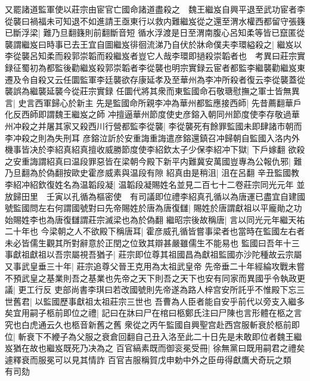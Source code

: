 又罷諸道監軍使以莊宗由宦官亡國命諸道盡殺之　魏王繼岌自興平退至武功宦者李從襲曰禍福未可知退不如進請王亟東行以救内難繼岌從之還至渭水權西都留守張籛已斷浮梁|{
	難乃旦翻籛則前翻斷音短}
循水浮渡是日至渭南腹心呂知柔等皆已竄匿從襲謂繼岌曰時事已去王宜自圖繼岌徘徊流涕乃自伏於牀命僕夫李環縊殺之|{
	繼岌以李從襲呂知柔而殺郭崇韜而殺繼岌者豈它人哉李環即撾殺崇韜者也　考異曰莊宗實録征蜀初為都監後勸繼岌殺郭崇韜者李從襲也明宗實録云宦者都監李繼襲勸繼岌東遷及令自殺又云任圜監軍李廷襲欲存康延孝及至華州為李冲所殺者復云李從襲蓋從襲誤為繼襲延襲今從莊宗實録}
任圜代將其衆而東監國命石敬瑭慰撫之軍士皆無異言|{
	史言西軍歸心於新主}
先是監國命所親李冲為華州都監應接西師|{
	先昔薦翻華戶化反西師即謂魏王繼岌之師}
冲擅逼華州節度使史彦鎔入朝同州節度使李存敬過華州冲殺之并屠其家又殺西川行營都監李從襲|{
	李從襲死有餘罪監國未即肆諸市朝而李冲殺之則為失刑耳}
彦鎔泣訢於安重誨重誨遣彦鎔還鎮召冲歸朝自監國入洛内外機事皆决於李紹真紹真擅收威勝節度使李紹欽太子少保李紹冲下獄|{
	下戶嫁翻}
欲殺之安重誨謂紹真曰温段罪惡皆在梁朝今殿下新平内難冀安萬國豈專為公報仇邪|{
	難乃旦翻為於偽翻按歐史霍彦威素與温段有隙}
紹真由是稍沮|{
	沮在呂翻}
辛丑監國教李紹冲紹欽復姓名為温韜段凝|{
	温韜段凝賜姓名並見二百七十二卷莊宗同光元年}
並放歸田里　壬寅以孔循為樞密使　有司議即位禮李紹真孔循以為唐運已盡宜自建國號監國問左右何謂國號對曰先帝賜姓於唐為唐復讎|{
	賜姓於唐謂獻祖以平龐勛之功始賜姓李也為唐復讎謂莊宗滅梁也為於偽翻}
繼昭宗後故稱唐|{
	言以同光元年繼天祐二十年也}
今梁朝之人不欲殿下稱唐耳|{
	霍彦威孔循皆嘗事梁者也當時在監國左右者未必皆儒生觀其所對辭意於正閏之位致其辯甚嚴雖儒生不能易也}
監國曰吾年十三事獻祖獻祖以吾宗屬視吾猶子|{
	莊宗即位尊其祖國昌為獻祖監國亦沙陀種故云宗屬}
又事武皇垂三十年|{
	莊宗追尊父晉王克用為太祖武皇帝}
先帝垂二十年經綸攻戰未嘗不預武皇之基業則吾之基業也先帝之天下則吾之天下也安有同家而異國乎令執政更議|{
	更工行反}
吏部尚書李琪曰若改國號則先帝遂為路人梓宫安所託乎不惟殿下忘三世舊君|{
	以監國歷事獻祖太祖莊宗三世也}
吾曹為人臣者能自安乎前代以旁支入繼多矣宜用嗣子柩前即位之禮|{
	記曰在牀曰尸在棺曰柩鄭氏注曰尸陳也言形體在柩之言究也白虎通云久也柩音新舊之舊}
衆從之丙午監國自興聖宫赴西宫服斬衰於柩前即位|{
	斬衰下不緶子為父服之衰倉回翻自己丑入洛至此二十日先是未敢即位者魏王繼岌猶在故也繼岌既死乃决為之}
百官縞素既而御衮冕受冊|{
	徐無黨曰既用嗣君之禮矣遽釋衰而服冕可以見其情詐}
百官吉服稱賀戊申勅中外之臣毋得獻鷹犬奇玩之類　有司劾

